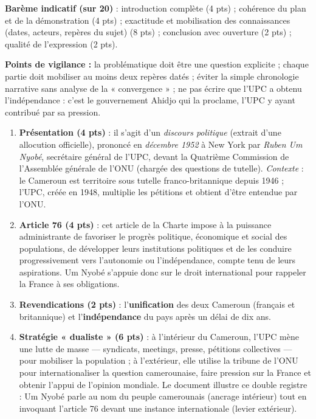 \documentclass[11pt]{article}
\begin{document}
\begin{corrige}
\textbf{Barème indicatif (sur 20)} : introduction complète (4 pts) ; cohérence du plan et de la démonstration (4 pts) ; exactitude et mobilisation des connaissances (dates, acteurs, repères du sujet) (8 pts) ; conclusion avec ouverture (2 pts) ; qualité de l'expression (2 pts).

\textbf{Points de vigilance :} la problématique doit être une question explicite ; chaque partie doit mobiliser au moins deux repères datés ; éviter la simple chronologie narrative sans analyse de la « convergence » ; ne pas écrire que l'UPC a obtenu l'indépendance : c'est le gouvernement Ahidjo qui la proclame, l'UPC y ayant contribué par sa pression.
\end{corrige}

\begin{corrige}
\begin{enumerate}
\item \textbf{Présentation (4 pts)} : il s'agit d'un \emph{discours politique} (extrait d'une allocution officielle), prononcé en \emph{décembre 1952} à New York par \emph{Ruben Um Nyobé}, secrétaire général de l'UPC, devant la Quatrième Commission de l'Assemblée générale de l'ONU (chargée des questions de tutelle). \emph{Contexte} : le Cameroun est territoire sous tutelle franco-britannique depuis 1946 ; l'UPC, créée en 1948, multiplie les pétitions et obtient d'être entendue par l'ONU.
\item \textbf{Article 76 (4 pts)} : cet article de la Charte impose à la puissance administrante de favoriser le progrès politique, économique et social des populations, de développer leurs institutions politiques et de les conduire progressivement vers l'autonomie ou l'indépendance, compte tenu de leurs aspirations. Um Nyobé s'appuie donc sur le droit international pour rappeler la France à ses obligations.
\item \textbf{Revendications (2 pts)} : l'\textbf{unification} des deux Cameroun (français et britannique) et l'\textbf{indépendance} du pays après un délai de dix ans.
\item \textbf{Stratégie « dualiste » (6 pts)} : à l'intérieur du Cameroun, l'UPC mène une lutte de masse — syndicats, meetings, presse, pétitions collectives — pour mobiliser la population ; à l'extérieur, elle utilise la tribune de l'ONU pour internationaliser la question camerounaise, faire pression sur la France et obtenir l'appui de l'opinion mondiale. Le document illustre ce double registre : Um Nyobé parle au nom du peuple camerounais (ancrage intérieur) tout en invoquant l'article 76 devant une instance internationale (levier extérieur).

\end{enumerate}
\end{corrige}
\end{document}

